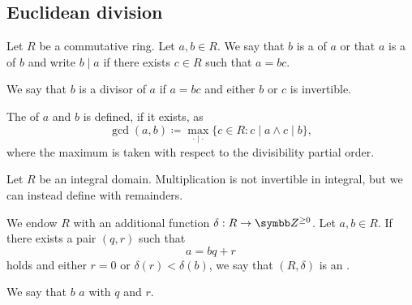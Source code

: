 \subsection{Euclidean division}\label{subsec:euclidean_division}

\begin{definition}\label{def:commutative_ring_division}
  Let \( R \) be a commutative ring. Let \( a, b \in R \). We say that \( b \) is a  of \( a \) or that \( a \) is a  of \( b \) and write \( b \mid a \) if there exists \( c \in R \) such that \( a = bc \).

  We say that \( b \) is a  divisor of \( a \) if \( a = bc \) and either \( b \) or \( c \) is invertible.

  The  of \( a \) and \( b \) is defined, if it exists, as
  \begin{equation*}
    \gcd(a, b) \coloneqq \max_{\cdot \mid \cdot} \{ c \in R : c \mid a \land c \mid b \},
  \end{equation*}
  where the maximum is taken with respect to the divisibility partial order.
\end{definition}

\begin{definition}\label{def:euclidean_domain}\cite{nLab:euclidean_domain}
  Let \( R \) be an integral domain. Multiplication is not invertible in integral, but we can instead define  with remainders.

  We endow \( R \) with an additional function \( \delta: R \to \Z^{\geq 0} \). Let \( a, b \in R \). If there exists a pair \( (q, r) \) such that
  \begin{equation*}
    a = bq + r
  \end{equation*}
  holds and either \( r = 0 \) or \( \delta(r) < \delta(b) \), we say that \( (R, \delta) \) is an .

  We say that \( b \)  \( a \) with  \( q \) and  \( r \).
\end{definition}

